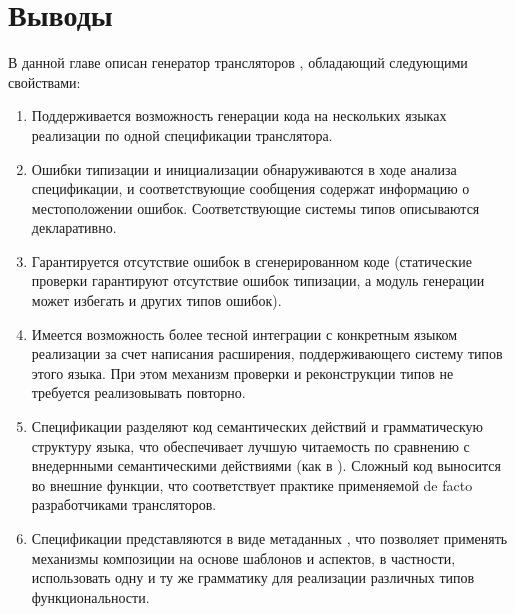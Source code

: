 \section{Выводы}

В данной главе описан генератор трансляторов \ATF{}, обладающий следующими свойствами:
\begin{enumerate}
\item Поддерживается возможность генерации кода на нескольких языках реализации по одной спецификации транслятора. 
\item Ошибки типизации и инициализации обнаруживаются в ходе анализа спецификации, и соответствующие сообщения содержат информацию о местоположении ошибок. Соответствующие системы типов описываются декларативно.
\item Гарантируется отсутствие ошибок в сгенерированном коде (статические проверки гарантируют отсутствие ошибок типизации, а модуль генерации может избегать и других типов ошибок). 
\item Имеется возможность более тесной интеграции с конкретным языком реализации за счет написания расширения, поддерживающего систему типов этого языка. При этом механизм проверки и реконструкции типов не требуется реализовывать повторно.
\item Спецификации разделяют код семантических действий и грамматическую структуру языка, что обеспечивает лучшую читаемость по сравнению с внедернными семантическими действиями (как в ). Сложный код выносится во внешние функции, что соответствует практике применяемой de facto разработчиками трансляторов.
\item Спецификации представляются в виде метаданных \GRM{}, что позволяет применять механизмы композиции на основе шаблонов и аспектов, в частности, использовать одну и ту же грамматику для реализации различных типов функциональности.
\end{enumerate}